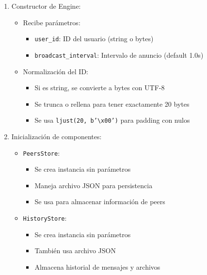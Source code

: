 \documentclass[12pt]{article}
\begin{document}
\begin{enumerate}
    \item Constructor de Engine:
    \begin{itemize}
        \item Recibe parámetros:
        \begin{itemize}
            \item \texttt{user\_id}: ID del usuario (string o bytes)
            \item \texttt{broadcast\_interval}: Intervalo de anuncio (default 1.0s)
        \end{itemize}
        \item Normalización del ID:
        \begin{itemize}
            \item Si es string, se convierte a bytes con UTF-8
            \item Se trunca o rellena para tener exactamente 20 bytes
            \item Se usa \texttt{ljust(20, b'\textbackslash x00')} para padding con nulos
        \end{itemize}
    \end{itemize}

    \item Inicialización de componentes:
    \begin{itemize}
        \item \texttt{PeersStore}:
        \begin{itemize}
            \item Se crea instancia sin parámetros
            \item Maneja archivo JSON para persistencia
            \item Se usa para almacenar información de peers
        \end{itemize}
        \item \texttt{HistoryStore}:
        \begin{itemize}
            \item Se crea instancia sin parámetros
            \item También usa archivo JSON
            \item Almacena historial de mensajes y archivos
        \end{itemize}
    \end{itemize}


\end{enumerate}
\end{document}

